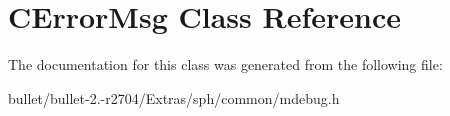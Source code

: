 \hypertarget{class_c_error_msg}{\section{C\+Error\+Msg Class Reference}
\label{class_c_error_msg}
}


The documentation for this class was generated from the following file\+:\begin{DoxyCompactItemize}
\item 
bullet/bullet-\/2.-\/r2704/\+Extras/sph/common/mdebug.\+h\end{DoxyCompactItemize}
